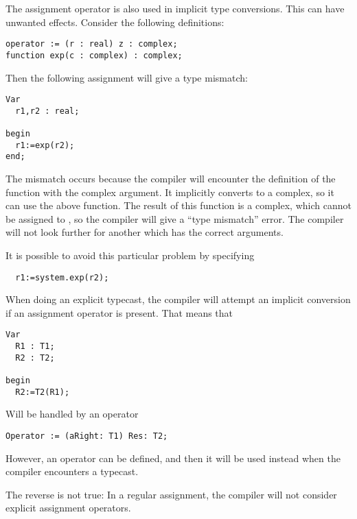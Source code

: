 \begin{remark}
The assignment operator is also used in implicit type conversions. This can
have unwanted effects. Consider the following definitions:
\begin{verbatim}
operator := (r : real) z : complex;
function exp(c : complex) : complex;
\end{verbatim}
Then the following assignment will give a type mismatch:
\begin{verbatim}
Var
  r1,r2 : real;

begin
  r1:=exp(r2);
end;
\end{verbatim}
The mismatch occurs because the compiler will encounter the definition of the  function
with the complex argument. It implicitly converts  to a complex, so it can
use the above  function. The result of this function is a complex,
which cannot be assigned to , so the compiler will give a ``type mismatch''
error. The compiler will not look further for another  which has
the correct arguments.

It is possible to avoid this particular problem by specifying
\begin{verbatim}
  r1:=system.exp(r2);
\end{verbatim}
\end{remark}

When doing an explicit typecast, the compiler will attempt an implicit conversion
if an assignment operator is present. That means that
\begin{verbatim}
Var
  R1 : T1;
  R2 : T2;

begin
  R2:=T2(R1);
\end{verbatim}
Will be handled by an operator
\begin{verbatim}
Operator := (aRight: T1) Res: T2;
\end{verbatim}
However, an  operator can be defined, and then it will be
used instead when the compiler encounters a typecast.

The reverse is not true: In a regular assignment, the compiler will not
consider explicit assignment operators.

